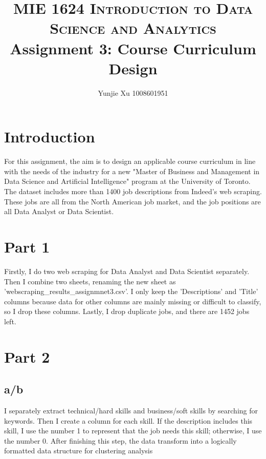 \documentclass[10pt,onecolumn,letterpaper]{article}
\title{
		\usefont{OT1}{bch}{b}{n}
		\normalfont \normalsize \textsc{MIE 1624 Introduction to Data Science and Analytics} \\ [10pt]
		\huge Assignment 3: Course Curriculum Design \\
}
\author{Yunjie Xu 1008601951}
\affil{\small{Department of Mechanical and Industrial Engineering, University of Toronto}}
\begin{document}
\maketitle




\section*{Introduction}
For this assignment, the aim is to design an applicable course curriculum in line with the needs of the industry for a new "Master of Business and Management in Data Science and Artificial Intelligence" program at the University of Toronto. The dataset includes more than 1400 job descriptions from Indeed's web scraping. These jobs are all from the North American job market, and the job positions are all Data Analyst or Data Scientist.


\section*{Part 1}
Firstly, I do two web scraping for Data Analyst and Data Scientist separately. Then I combine two sheets, renaming the new sheet as 'webscraping\_results\_assignmnet3.csv'. I only keep the 'Descriptions' and 'Title' columns because data for other columns are mainly missing or difficult to classify, so I drop these columns. Lastly, I drop duplicate jobs, and there are 1452 jobs left.

\section*{Part 2}
\subsection*{a/b}
I separately extract technical/hard skills and business/soft skills by searching for keywords. Then I create a column for each skill. If the description includes this skill, I use the number 1 to represent that the job needs this skill; otherwise, I use the number 0. After finishing this step, the data transform into a logically formatted data structure for clustering analysis 
\end{document}
